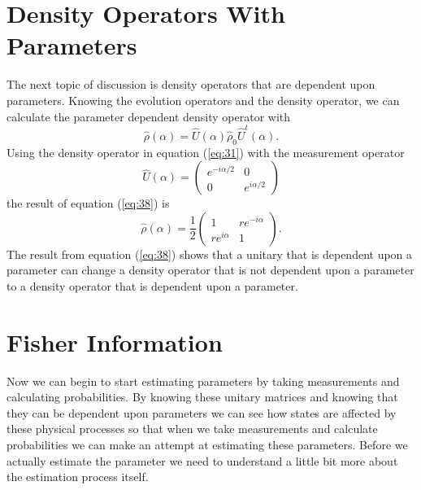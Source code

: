 \documentclass[twocolumn]{article}
\begin{document}
\section*{Density Operators With Parameters}
The next topic of discussion is density operators that are dependent upon parameters. Knowing the evolution operators and the density operator, we can calculate the parameter dependent density operator with
\begin{equation} \label{eq:36}
\hat{\rho}(\alpha)=\hat{U}(\alpha)\hat{\rho}_0\hat{U}^{t}(\alpha).
\end{equation}
Using the density operator in equation (\ref{eq:31}) with the measurement operator
\begin{equation} \label{eq:37}
\hat{U}(\alpha)=
\begin{pmatrix}
e^{-i\alpha/2} & 0 \\
0 & e^{i\alpha/2}
\end{pmatrix}
\end{equation}
the result of equation (\ref{eq:38}) is
\begin{equation} \label{eq:38}
\hat{\rho}(\alpha)=\frac{1}{2}
\begin{pmatrix}
1 & re^{-i\alpha} \\
re^{i\alpha} & 1
\end{pmatrix}.
\end{equation}
The result from equation (\ref{eq:38}) shows that a unitary that is dependent upon a parameter can change a density operator that is not dependent upon a parameter to a density operator that is dependent upon a parameter.
\section*{Fisher Information}
Now we can begin to start estimating parameters by taking measurements and calculating probabilities. By knowing these unitary matrices and knowing that they can be dependent upon parameters we can see how states are affected by these physical processes so that when we take measurements and calculate probabilities we can make an attempt at estimating these parameters. Before we actually estimate the parameter we need to understand a little bit more about the estimation process itself.
\end{document}
